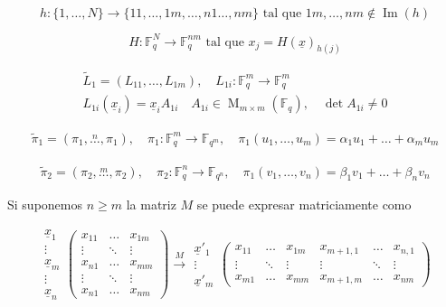 \documentclass[12pt]{article}
\begin{document}
\[
h:\{1,\dots,N\}\longrightarrow
\{11,\dots,1m,\dots,n1\dots,nm\}
\text{ tal que }
1m,\dots,nm\notin\operatorname{Im}(h)
\]

\[
H:\mathbb{F}_q^N\longrightarrow
\mathbb{F}_q^{nm}
\text{ tal que }
x_j=H(\underline{x})_{h(j)}
\]

\begin{gather*}
\tilde{L}_1=(L_{11},\dots,L_{1m}),\quad L_{1i}:\mathbb{F}_q^{m}\to \mathbb{F}_q^{m}\\
L_{1i}(\underline{x}_i)=\underline{x}_i A_{1i}\quad
A_{1i}\in\operatorname{M}_{m\times m}(\mathbb{F}_q),\quad 
\det A_{1i}\neq 0
\end{gather*}

\begin{gather*}
\tilde{\pi}_1=(\pi_1,\overset{n}{\dots},\pi_1),\quad \pi_1:\mathbb{F}_q^{m}\to\mathbb{F}_{q^{m}},\quad
\pi_1(u_1,\dots,u_m)=\alpha_1 u_1+\dots+\alpha_m u_m
\end{gather*}

\begin{gather*}
\tilde{\pi}_2=(\pi_2,\overset{m}{\dots},\pi_2),\quad \pi_2:\mathbb{F}_q^{n}\to\mathbb{F}_{q^{n}},\quad
\pi_1(v_1,\dots,v_n)=\beta_1 v_1+\dots+\beta_n v_n
\end{gather*}

Si suponemos $n\geq m$ la matriz $M$ se puede expresar matriciamente como

\[
\begin{matrix}
\underline{x}_1\\
\vdots\\
\underline{x}_m\\
\vdots\\
\underline{x}_n
\end{matrix}
\begin{pmatrix}
x_{11}&\dots&x_{1m}\\
\vdots&\ddots&\vdots\\
x_{n1}&\dots&x_{mm}\\
\vdots&\ddots&\vdots\\
x_{n1}&\dots&x_{nm}
\end{pmatrix}
\overset{M}{\longrightarrow}
\begin{matrix}
\underline{x}'_1\\
\vdots\\
\underline{x}'_m
\end{matrix}
\begin{pmatrix}
x_{11}&\dots&x_{1m}&x_{m+1,1}&\dots&x_{n,1}\\
\vdots&\ddots&\vdots&\vdots&\ddots&\vdots\\
x_{m1}&\dots&x_{mm}&x_{m+1,m}&\dots&x_{nm}
\end{pmatrix}
\]
\end{document}
